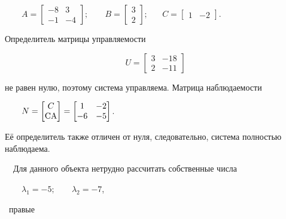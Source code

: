 \documentclass[a4paper]{article}
\newcommand\normalsubformula[1]{\text{\mathversion{normal}$#1$}}
\begin{document}
{\begin{russian}\sffamily
\ \ \ \ 
$A=\left[\begin{matrix}-8&3\\-1&-4\end{matrix}\right];\;\;\;\;\;\;\;B=\left[\begin{matrix}3\\2\end{matrix}\right];\;\;\;\;\;\;C=\left[\begin{matrix}1&-2\end{matrix}\right]$.
\end{russian}}

{\begin{russian}\sffamily
Определитель матрицы управляемости 
\end{russian}}

\begin{equation*}
U=\left[\begin{matrix}3&-18\\2&-11\end{matrix}\right]
\end{equation*}
{\begin{russian}\sffamily
не равен нулю, поэтому система управляема. Матрица наблюдаемости
\end{russian}}

{\begin{russian}\sffamily
\ \ \ \ 
$N=\left[\begin{matrix}C\\\normalsubformula{\text{CA}}\end{matrix}\right]=\left[\begin{matrix}1&-2\\-6&-5\end{matrix}\right]$.
\end{russian}}

{\begin{russian}\sffamily
Её определитель также отличен от нуля, следовательно, система полностью наблюдаема.
\end{russian}}

{\begin{russian}\sffamily
\ \ Для данного объекта нетрудно рассчитать собственные числа
\end{russian}}

{\begin{russian}\sffamily
\ \ \ \  $λ_1=-5;\;\;\;\;\;\;\;λ_2=-7$,
\end{russian}}

{\begin{russian}\sffamily
\ правые
\end{russian}}
\end{document}
